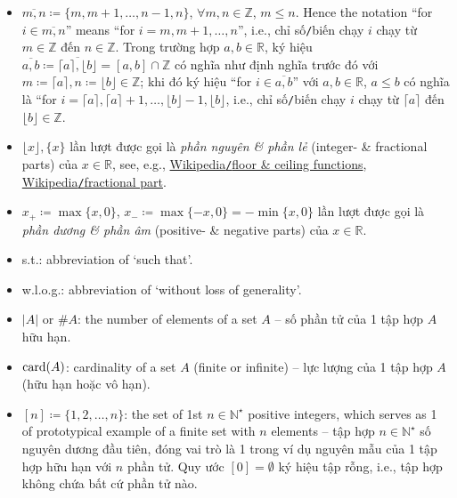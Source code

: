\documentclass{article}
\begin{document}
\begin{itemize}
    \item $\overline{m,n}\coloneqq\{m,m + 1,\ldots,n - 1, n\}$, $\forall m,n\in\mathbb{Z}$, $m\le n$. Hence the notation ``for $i\in\overline{m,n}$'' means ``for $i = m,m + 1,\ldots,n$'', i.e., chỉ số{\tt/}biến chạy $i$ chạy từ $m\in\mathbb{Z}$ đến $n\in\mathbb{Z}$. Trong trường hợp $a,b\in\mathbb{R}$, ký hiệu $\overline{a,b}\coloneqq\overline{\lceil a\rceil,\lfloor b\rfloor} = [a,b]\cap\mathbb{Z}$ có nghĩa như định nghĩa trước đó với $m\coloneqq\lceil a\rceil,n\coloneqq\lfloor b\rfloor\in\mathbb{Z}$; khi đó ký hiệu ``for $i\in\overline{a,b}$'' với $a,b\in\mathbb{R}$, $a\le b$ có nghĩa là ``for $i = \lceil a\rceil,\lceil a\rceil + 1,\ldots,\lfloor b\rfloor - 1,\lfloor b\rfloor$, i.e., chỉ số{\tt/}biến chạy $i$ chạy từ $\lceil a\rceil$ đến $\lfloor b\rfloor\in\mathbb{Z}$.
    \item $\lfloor x\rfloor,\{x\}$ lần lượt được gọi là {\it phần nguyên \& phần lẻ} (integer- \& fractional parts) của $x\in\mathbb{R}$, see, e.g., \href{https://en.wikipedia.org/wiki/Floor_and_ceiling_functions}{Wikipedia{\tt/}floor \& ceiling functions}, \href{https://en.wikipedia.org/wiki/Fractional_part}{Wikipedia{\tt/}fractional part}.
    \item $x_+\coloneqq\max\{x,0\}$, $x_-\coloneqq\max\{-x,0\} = -\min\{x,0\}$ lần lượt được gọi là {\it phần dương \& phần âm} (positive- \& negative parts) của $x\in\mathbb{R}$.
    \item s.t.: abbreviation of `such that'.
    \item w.l.o.g.: abbreviation of `without loss of generality'.
    \item $|A|$ or $\#A$: the number of elements of a set $A$ -- số phần tử của 1 tập hợp $A$ hữu hạn.
    \item ${\rm card}(A)$: cardinality of a set $A$ (finite or infinite) -- lực lượng của 1 tập hợp $A$ (hữu hạn hoặc vô hạn).
    \item $[n]\coloneqq\{1,2,\ldots,n\}$: the set of 1st $n\in\mathbb{N}^\star$ positive integers, which serves as 1 of prototypical example of a finite set with $n$ elements -- tập hợp $n\in\mathbb{N}^\star$ số nguyên dương  đầu tiên, đóng vai trò là 1 trong ví dụ nguyên mẫu của 1 tập hợp hữu hạn với $n$ phần tử. Quy ước $[0] = \emptyset$ ký hiệu tập rỗng, i.e., tập hợp không chứa bất cứ phần tử nào.


\end{itemize}
\end{document}
